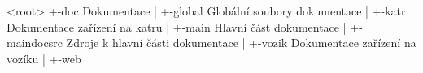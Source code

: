 \begin{DoxyVerb}
<root>
  +-doc              Dokumentace
  |  +-global        Globální soubory dokumentace
  |  +-katr          Dokumentace zařízení na katru
  |  +-main          Hlavní část dokumentace
  |  +-maindocsrc    Zdroje k hlavní části dokumentace
  |  +-vozik         Dokumentace zařízení na vozíku
  |  +-web           

\end{DoxyVerb}
 